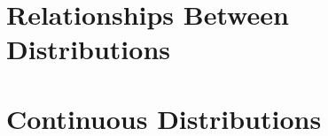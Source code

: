 \clearpage










\chapter{Relationships Between Distributions}









\chapter{Continuous Distributions}







